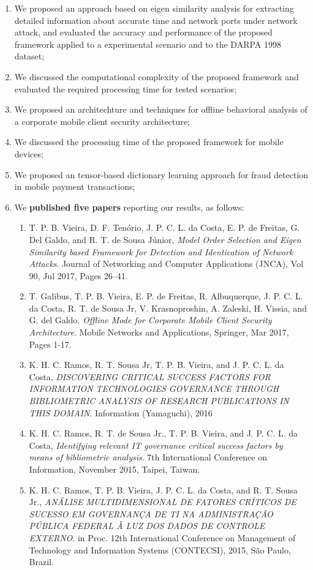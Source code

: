 \begin{enumerate}
	\item We proposed an approach based on eigen similarity analysis for extracting detailed information about accurate time and network ports under network attack, and evaluated the accuracy and performance of the proposed framework applied to a experimental scenario and to the DARPA 1998 dataset;
	\item We discussed the computational complexity of the proposed framework and evaluated the required processing time for tested scenarios;
	\item We proposed an architechture and techniques for offline behavioral analysis of a corporate mobile client security architecture;
	\item We discussed the processing time of the proposed framework for mobile devices;
	\item We proposed an tensor-based dictionary learning approach for fraud detection in mobile payment transactions;
	\item We \textbf{published five papers} reporting our results, as follows:
	\begin{enumerate}
		\item T. P. B. Vieira, D. F. Ten\'orio, J. P. C. L. da Costa, E. P. de Freitas, G. Del Galdo, and R. T. de Sousa J\'unior, \textit{Model Order Selection and Eigen Similarity based Framework for Detection and Identication of Network Attacks}. Journal of Networking and Computer Applications (JNCA), Vol 90, Jul 2017, Pages 26–41.
		\item T. Galibus, T. P. B. Vieira, E. P. de Freitas, R. Albuquerque, J. P. C. L. da Costa, R. T. de Sousa Jr, V. Krasnoproshin, A. Zaleski, H. Vissia, and G. del Galdo, \textit{Offline Mode for Corporate Mobile Client Security Architecture}. Mobile Networks and Applications, Springer, Mar 2017, Pages 1-17.
		\item K. H. C. Ramos, R. T. Sousa Jr, T. P. B. Vieira, and J. P. C. L. da Costa, \textit{DISCOVERING CRITICAL SUCCESS FACTORS FOR INFORMATION TECHNOLOGIES GOVERNANCE THROUGH BIBLIOMETRIC ANALYSIS OF RESEARCH PUBLICATIONS IN THIS DOMAIN}. Information (Yamaguchi), 2016
		\item K. H. C. Ramos, R. T. de Sousa Jr., T. P. B. Vieira, and J. P. C. L. da Costa, \textit{Identifying relevant IT governance critical success factors by means of bibliometric analysis}. 7th International Conference on Information, November 2015, Taipei, Taiwan.
		\item K. H. C. Ramos, T. P. B. Vieira, J. P. C. L. da Costa, and R. T. Sousa Jr., \textit{ANÁLISE MULTIDIMENSIONAL DE FATORES CRÍTICOS DE SUCESSO EM GOVERNANÇA DE TI NA ADMINISTRAÇÃO PÚBLICA FEDERAL À LUZ DOS DADOS DE CONTROLE EXTERNO}. in Proc. 12th International Conference on Management of Technology and Information Systems (CONTECSI), 2015, São Paulo, Brazil.
	\end{enumerate}
\end{enumerate}


